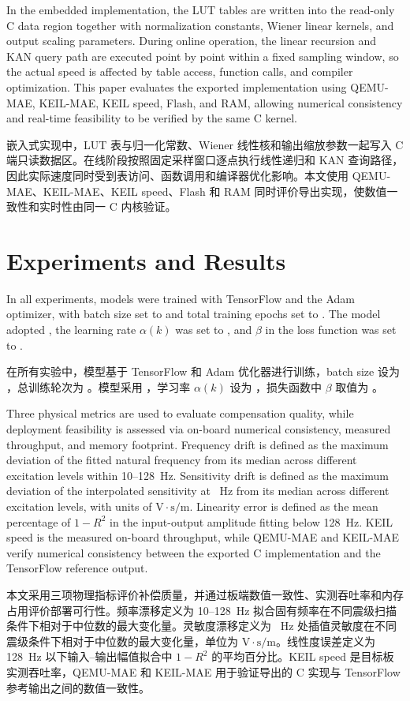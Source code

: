 \documentclass[sn-nature]{sn-jnl}
\newif\ifCNENEnglish
\newif\ifCNENBilingual
\newcommand{\CNEN}[2]{%
    \ifCNENBilingual
        #1%
        \if\relax\detokenize{#2}\relax\else\par #2\fi%
    \else
        \ifCNENEnglish
            #2%
        \else
            #1%
        \fi
    \fi
}
\newcommand{\wMAE}{\beta} %
\newcommand{\lr}{\alpha} %
\newcommand{\lridx}{k} %
\begin{document}
\CNEN{嵌入式实现中，LUT 表与归一化常数、Wiener 线性核和输出缩放参数一起写入 C 端只读数据区。在线阶段按照固定采样窗口逐点执行线性递归和 KAN 查询路径，因此实际速度同时受到表访问、函数调用和编译器优化影响。本文使用 QEMU-MAE、KEIL-MAE、KEIL speed、Flash 和 RAM 同时评价导出实现，使数值一致性和实时性由同一 C 内核验证。}{In the embedded implementation, the LUT tables are written into the read-only C data region together with normalization constants, Wiener linear kernels, and output scaling parameters. During online operation, the linear recursion and KAN query path are executed point by point within a fixed sampling window, so the actual speed is affected by table access, function calls, and compiler optimization. This paper evaluates the exported implementation using QEMU-MAE, KEIL-MAE, KEIL speed, Flash, and RAM, allowing numerical consistency and real-time feasibility to be verified by the same C kernel.}



\section{Experiments and Results}

\CNEN{在所有实验中，模型基于 TensorFlow 和 Adam 优化器进行训练，batch size 设为 \valBatchSize，总训练轮次为 \valEpochs。模型采用 \valLearningRateSchedule{}，学习率 $\lr(\lridx)$ 设为 \valInitLR，损失函数中 $\wMAE$ 取值为 \valMaeWeight。}{In all experiments, models were trained with TensorFlow and the Adam optimizer, with batch size set to \valBatchSize{} and total training epochs set to \valEpochs. The model adopted \valLearningRateSchedule{}, the learning rate $\lr(\lridx)$ was set to \valInitLR, and $\wMAE$ in the loss function was set to \valMaeWeight.%
}

\CNEN{本文采用三项物理指标评价补偿质量，并通过板端数值一致性、实测吞吐率和内存占用评价部署可行性。频率漂移定义为 10--128~Hz 拟合固有频率在不同震级扫描条件下相对于中位数的最大变化量。灵敏度漂移定义为 \valSensitivityCompareFreq~Hz 处插值灵敏度在不同震级条件下相对于中位数的最大变化量，单位为 $\text{V}\cdot\text{s}/\text{m}$。线性度误差定义为 128~Hz 以下输入--输出幅值拟合中 $1-R^2$ 的平均百分比。KEIL speed 是目标板实测吞吐率，QEMU-MAE 和 KEIL-MAE 用于验证导出的 C 实现与 TensorFlow 参考输出之间的数值一致性。}{Three physical metrics are used to evaluate compensation quality, while deployment feasibility is assessed via on-board numerical consistency, measured throughput, and memory footprint. Frequency drift is defined as the maximum deviation of the fitted natural frequency from its median across different excitation levels within 10--128~Hz. Sensitivity drift is defined as the maximum deviation of the interpolated sensitivity at \valSensitivityCompareFreq~Hz from its median across different excitation levels, with units of $\text{V}\cdot\text{s}/\text{m}$. Linearity error is defined as the mean percentage of $1-R^2$ in the input-output amplitude fitting below 128~Hz. KEIL speed is the measured on-board throughput, while QEMU-MAE and KEIL-MAE verify numerical consistency between the exported C implementation and the TensorFlow reference output.%
}
\end{document}
